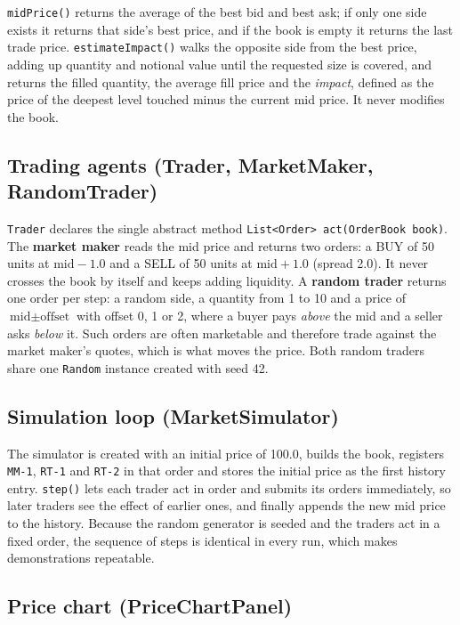 \documentclass[12pt,a4paper,openany,oneside]{report}
\newcommand{\code}[1]{\texttt{#1}}
\begin{document}
\code{midPrice()} returns the average of the best bid and best ask; if only one side exists it returns that side's best price, and if the book is empty it returns the last trade price. \code{estimateImpact()} walks the opposite side from the best price, adding up quantity and notional value until the requested size is covered, and returns the filled quantity, the average fill price and the \emph{impact}, defined as the price of the deepest level touched minus the current mid price. It never modifies the book.

\subsection{Trading agents (Trader, MarketMaker, RandomTrader)}

\code{Trader} declares the single abstract method \code{List<Order> act(OrderBook book)}. The \textbf{market maker} reads the mid price and returns two orders: a BUY of 50 units at $\text{mid}-1.0$ and a SELL of 50 units at $\text{mid}+1.0$ (spread 2.0). It never crosses the book by itself and keeps adding liquidity. A \textbf{random trader} returns one order per step: a random side, a quantity from 1 to 10 and a price of $\text{mid}\pm\text{offset}$ with offset 0, 1 or 2, where a buyer pays \emph{above} the mid and a seller asks \emph{below} it. Such orders are often marketable and therefore trade against the market maker's quotes, which is what moves the price. Both random traders share one \code{Random} instance created with seed 42.

\subsection{Simulation loop (MarketSimulator)}

The simulator is created with an initial price of 100.0, builds the book, registers \code{MM-1}, \code{RT-1} and \code{RT-2} in that order and stores the initial price as the first history entry. \code{step()} lets each trader act in order and submits its orders immediately, so later traders see the effect of earlier ones, and finally appends the new mid price to the history. Because the random generator is seeded and the traders act in a fixed order, the sequence of steps is identical in every run, which makes demonstrations repeatable.

\subsection{Price chart (PriceChartPanel)}
\end{document}
